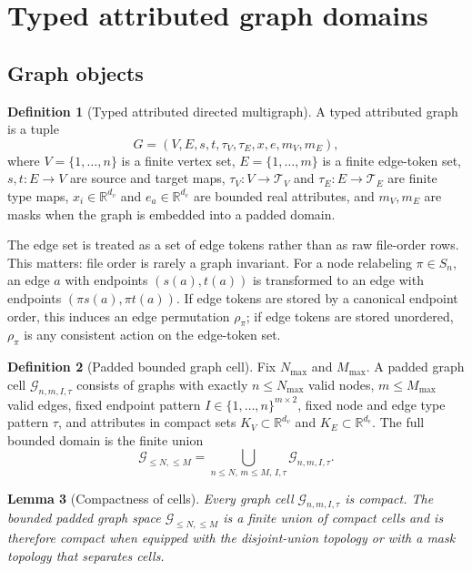 \documentclass[11pt]{article}
\theoremstyle{definition}
\newtheorem{definition}{Definition}[section]
\theoremstyle{plain}
\newtheorem{lemma}[definition]{Lemma}
\theoremstyle{remark}
\numberwithin{equation}{section}
\newcommand{\R}{\mathbb{R}}
\newcommand{\G}{\mathcal{G}}
\begin{document}
\section{Typed attributed graph domains}

\subsection{Graph objects}

\begin{definition}[Typed attributed directed multigraph]
A typed attributed graph is a tuple
\begin{equation}
  G=(V,E,s,t,\tau_V,\tau_E,x,e,m_V,m_E),
\end{equation}
where $V=\{1,\ldots,n\}$ is a finite vertex set, $E=\{1,\ldots,m\}$ is a finite edge-token set, $s,t:E\to V$ are source and target maps, $\tau_V:V\to\mathcal T_V$ and $\tau_E:E\to\mathcal T_E$ are finite type maps, $x_i\in\R^{d_v}$ and $e_a\in\R^{d_e}$ are bounded real attributes, and $m_V,m_E$ are masks when the graph is embedded into a padded domain.
\end{definition}

The edge set is treated as a set of edge tokens rather than as raw file-order rows.  This matters: file order is rarely a graph invariant.  For a node relabeling $\pi\in S_n$, an edge $a$ with endpoints $(s(a),t(a))$ is transformed to an edge with endpoints $(\pi s(a),\pi t(a))$.  If edge tokens are stored by a canonical endpoint order, this induces an edge permutation $\rho_\pi$; if edge tokens are stored unordered, $\rho_\pi$ is any consistent action on the edge-token set.

\begin{definition}[Padded bounded graph cell]
Fix $N_{\max}$ and $M_{\max}$.  A padded graph cell $\G_{n,m,I,\tau}$ consists of graphs with exactly $n\le N_{\max}$ valid nodes, $m\le M_{\max}$ valid edges, fixed endpoint pattern $I\in\{1,\ldots,n\}^{m\times 2}$, fixed node and edge type pattern $\tau$, and attributes in compact sets $K_V\subset\R^{d_v}$ and $K_E\subset\R^{d_e}$.  The full bounded domain is the finite union
\begin{equation}
  \G_{\le N,\le M}=\bigcup_{n\le N,\,m\le M,\,I,\tau}\G_{n,m,I,\tau}.
\end{equation}
\end{definition}

\begin{lemma}[Compactness of cells]
Every graph cell $\G_{n,m,I,\tau}$ is compact.  The bounded padded graph space $\G_{\le N,\le M}$ is a finite union of compact cells and is therefore compact when equipped with the disjoint-union topology or with a mask topology that separates cells.
\end{lemma}
\end{document}
